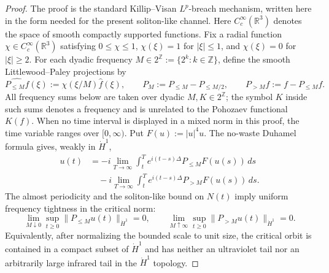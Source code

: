 \documentclass[smallextended,envcountsect,nospthms]{svjour3}
\numberwithin{equation}{section}
\theoremstyle{spbreak}
\theoremstyle{spdefbreak}
\theoremstyle{spdefbreak}
\newcommand{\R}{\mathbb R}
\begin{document}
\begin{proof}
The proof is the standard Killip--Visan $L^p$-breach mechanism, written here in the form needed for the present soliton-like channel. Here $C_c^\infty(\R^3)$ denotes the space of smooth compactly supported functions. Fix a radial function $\chi\in C_c^\infty(\R^3)$ satisfying $0\le\chi\le1$, $\chi(\xi)=1$ for $|\xi|\le1$, and $\chi(\xi)=0$ for $|\xi|\ge2$. For each dyadic frequency $M\in2^{\mathbb Z}:=\{2^k:k\in\mathbb Z\}$, define the smooth Littlewood--Paley projections by
\begin{equation*}
  \widehat{P_{\le M}f}(\xi):=\chi(\xi/M)\widehat f(\xi),
  \qquad
  P_M:=P_{\le M}-P_{\le M/2},
  \qquad
  P_{>M}f:=f-P_{\le M}f.
\end{equation*}
All frequency sums below are taken over dyadic $M,K\in2^{\mathbb Z}$; the symbol $K$ inside such sums denotes a frequency and is unrelated to the Pohozaev functional $K(f)$. When no time interval is displayed in a mixed norm in this proof, the time variable ranges over $[0,\infty)$. Put $F(u):=|u|^4u$. The no-waste Duhamel formula gives, weakly in $\dot H^1$,
\begin{align*}
  u(t)&=-i\lim_{T\to\infty}\int_t^T e^{i(t-s)\Delta}P_{\le M}F(u(s))\,ds \\
      &\quad -i\lim_{T\to\infty}\int_t^T e^{i(t-s)\Delta}P_{>M}F(u(s))\,ds.
\end{align*}
The almost periodicity and the soliton-like bound on $N(t)$ imply uniform frequency tightness in the critical norm:
\begin{equation*}
  \lim_{M\downarrow0}\sup_{t\ge0}\|P_{\le M}u(t)\|_{\dot H^1}=0,
  \qquad
  \lim_{M\uparrow\infty}\sup_{t\ge0}\|P_{>M}u(t)\|_{\dot H^1}=0.
\end{equation*}
Equivalently, after normalizing the bounded scale to unit size, the critical orbit is contained in a compact subset of $\dot H^1$ and has neither an ultraviolet tail nor an arbitrarily large infrared tail in the $\dot H^1$ topology.


\end{proof}
\end{document}
